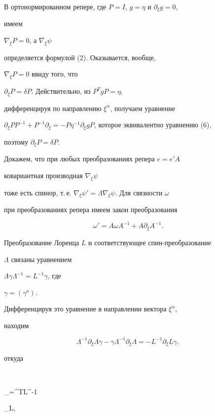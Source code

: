 В ортонормированном репере, где $P=I$, $g=\eta$ и $\partial_\xi g =0$,


имеем


$\nabla_\xi P=0 $, а $\nabla_\xi\psi $


определяется формулой (2). Оказывается, вообще,


$\nabla_\xi P=0$ ввиду того, что


$\partial_\xi P=\delta P$. Действительно, из $P^T gP=\eta$,


дифференцируя по направлению $\xi^\alpha$, получаем уравнение


$\partial_\xi PP^{-1}+P^{-1}\partial_\xi =


-P\eta^{-1}\partial_\xi gP$, которое эквивалентно уравнению (6),


поэтому $\partial_\xi P=\delta P $.





Докажем, что при любых преобразованиях репера $e=e'A$


ковариантная производная $\nabla_\xi\psi$


тоже есть спинор, т.\,е. $\nabla_\xi\psi'=


\Lambda\nabla_\xi\psi $. Для связности $\omega$


при преобразованиях репера имеем закон преобразования


$$


\omega'=A\omega A^{-1}+A\partial_\xi A^{-1}.


$$


Преобразование Лоренца $L$ и соответствующее спин-преобразование


$\Lambda$ связаны уравнением


$\Lambda\gamma\Lambda^{-1}=L^{-1}\gamma$, где


$\gamma=(\gamma^a).$


Дифференцируя это уравнение в направлении вектора $\xi^\alpha$,


находим


$$


\Lambda^{-1}\partial_\xi\Lambda\gamma-


\gamma \Lambda^{-1}\partial_\xi \Lambda=-L^{-1}\partial_\xi L


\gamma,


$$


откуда


$$


\partial_\xi\Lambda=\gamma^TL^{-1}


\partial_\xi L\gamma,


